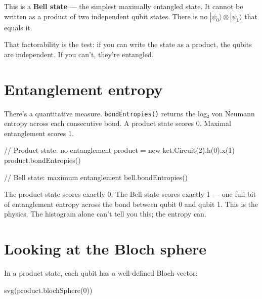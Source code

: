 \documentclass[
  11pt,
  letterpaper,
  oneside]{scrbook}
\newenvironment{Shaded}{\begin{snugshade}}{\end{snugshade}}
\newcommand{\NormalTok}[1]{\textcolor[rgb]{0.00,0.23,0.31}{#1}}
\begin{document}
This is a \textbf{Bell state} --- the simplest maximally entangled
state. It cannot be written as a product of two independent qubit
states. There is no \(|\psi_0\rangle \otimes |\psi_1\rangle\) that
equals it.

That factorability is the test: if you can write the state as a product,
the qubits are independent. If you can't, they're entangled.

\section{Entanglement entropy}\label{entanglement-entropy}

There's a quantitative measure. \texttt{bondEntropies()} returns the
log₂ von Neumann entropy across each consecutive bond. A product state
scores 0. Maximal entanglement scores 1.

\begin{Shaded}
\begin{Highlighting}[]
\NormalTok{// Product state: no entanglement}
\NormalTok{product = new ket.Circuit(2).h(0).x(1)}
\NormalTok{product.bondEntropies()}
\end{Highlighting}
\end{Shaded}

\begin{Shaded}
\begin{Highlighting}[]
\NormalTok{// Bell state: maximum entanglement}
\NormalTok{bell.bondEntropies()}
\end{Highlighting}
\end{Shaded}

The product state scores exactly 0. The Bell state scores exactly 1 ---
one full bit of entanglement entropy across the bond between qubit 0 and
qubit 1. This is the physics. The histogram alone can't tell you this;
the entropy can.

\section{Looking at the Bloch sphere}\label{looking-at-the-bloch-sphere}

In a product state, each qubit has a well-defined Bloch vector:

\begin{Shaded}
\begin{Highlighting}[]
\NormalTok{svg(product.blochSphere(0))}
\end{Highlighting}
\end{Shaded}
\end{document}
